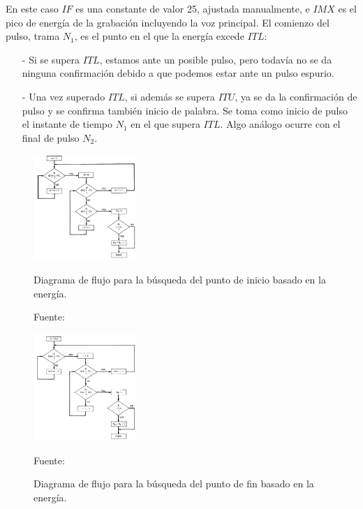 \begin{enumerate}
\begin{enumerate}
En este caso $IF$ es una constante de valor 25, ajustada manualmente, e $IMX$ es el pico de energía de la grabación incluyendo la voz principal. El comienzo del pulso, trama $N_{1}$, es el punto en el que la energía excede $ITL$:

\begin{enumerate}
\item[-]Si se supera $ITL$, estamos ante un posible pulso, pero todavía no se da ninguna confirmación debido a que podemos estar ante un pulso espurio.
\item[-]Una vez superado $ITL$, si además se supera $ITU$, ya se da la confirmación de pulso y se confirma también inicio de palabra. Se toma como inicio de pulso el instante de tiempo $N_{1}$ en el que supera $ITL$. Algo análogo ocurre con el final de pulso $N_{2}$.
\end{enumerate}

\newpage
\begin{figure}[ht]
\begin{center}
\includegraphics[width=0.35\textwidth]{Imagenes/Cap2/image028}
\end{center}
\begin{center}
\vskip -0.5cm
\caption{\small{Diagrama de flujo para la búsqueda del punto de inicio basado en la energía.}}
\label{fig:figura2.27}
{\small{Fuente: \cite{rabiner}}}
\end{center}

\begin{center}
\includegraphics[width=0.35\textwidth]{Imagenes/Cap2/image029}
\end{center}
\begin{center}
\vskip -0.5cm
\caption{\small{Diagrama de flujo para la búsqueda del punto de fin basado en la energía.}}
\label{fig:figura2.28}
{\small{Fuente: \cite{rabiner}}}
\end{center}
\end{figure}


\end{enumerate}
\end{enumerate}
